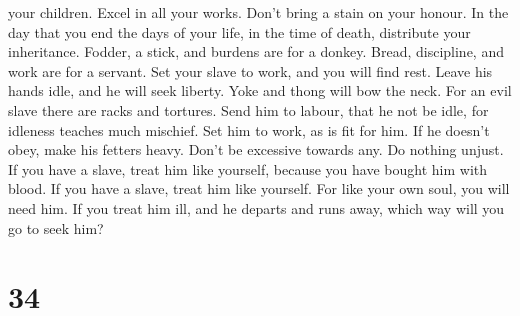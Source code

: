 your children.  Excel in all your works. Don't bring a
stain on your honour.  In the day that you end the days of
your life, in the time of death, distribute your inheritance.
 Fodder, a stick, and burdens are for a donkey. Bread,
discipline, and work are for a servant.  Set your slave to
work, and you will find rest. Leave his hands idle, and he will seek
liberty.  Yoke and thong will bow the neck. For an evil
slave there are racks and tortures.  Send him to labour,
that he not be idle, for idleness teaches much mischief. 
Set him to work, as is fit for him. If he doesn't obey, make his fetters
heavy.  Don't be excessive towards any. Do nothing unjust.
 If you have a slave, treat him like yourself, because you
have bought him with blood.  If you have a slave, treat him
like yourself. For like your own soul, you will need him. If you treat
him ill, and he departs and runs away,  which way will you
go to seek him?

\hypertarget{section-29}{%
\section{34}\label{section-29}}

